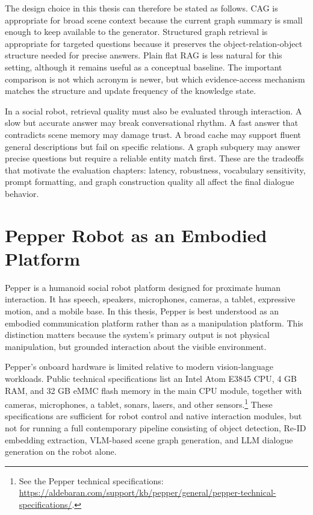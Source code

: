 The design choice in this thesis can therefore be stated as follows. CAG is appropriate for broad scene context because the current graph summary is small enough to keep available to the generator. Structured graph retrieval is appropriate for targeted questions because it preserves the object-relation-object structure needed for precise answers. Plain flat RAG is less natural for this setting, although it remains useful as a conceptual baseline. The important comparison is not which acronym is newer, but which evidence-access mechanism matches the structure and update frequency of the knowledge state.

In a social robot, retrieval quality must also be evaluated through interaction. A slow but accurate answer may break conversational rhythm. A fast answer that contradicts scene memory may damage trust. A broad cache may support fluent general descriptions but fail on specific relations. A graph subquery may answer precise questions but require a reliable entity match first. These are the tradeoffs that motivate the evaluation chapters: latency, robustness, vocabulary sensitivity, prompt formatting, and graph construction quality all affect the final dialogue behavior.

\section{Pepper Robot as an Embodied Platform}\label{sec:pepper-platform}

Pepper is a humanoid social robot platform designed for proximate human interaction. It has speech, speakers, microphones, cameras, a tablet, expressive motion, and a mobile base. In this thesis, Pepper is best understood as an embodied communication platform rather than as a manipulation platform. This distinction matters because the system's primary output is not physical manipulation, but grounded interaction about the visible environment.

Pepper's onboard hardware is limited relative to modern vision-language workloads. Public technical specifications list an Intel Atom E3845 CPU, 4 GB RAM, and 32 GB eMMC flash memory in the main CPU module, together with cameras, microphones, a tablet, sonars, lasers, and other sensors.\footnote{See the Pepper technical specifications: \url{https://aldebaran.com/support/kb/pepper/general/pepper-technical-specifications/}.} These specifications are sufficient for robot control and native interaction modules, but not for running a full contemporary pipeline consisting of object detection, Re-ID embedding extraction, VLM-based scene graph generation, and LLM dialogue generation on the robot alone.

